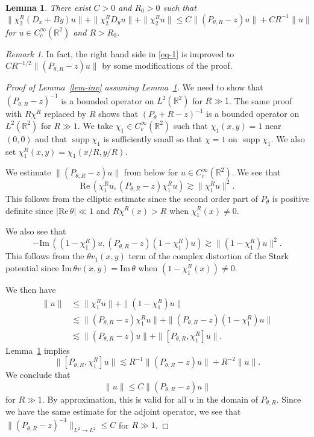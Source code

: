 \documentclass{article}
\theoremstyle{plain}
\newtheorem{lemma}[prop]{Lemma}
\theoremstyle{definition}
\theoremstyle{remark}
\newtheorem{remark}[prop]{Remark}
\newcommand{\RR}{\mathbb{R}}
\newcommand{\Cinf}{C^{\infty}}
\newcommand{\supp}{\mathop{\mathrm{supp}}}
\newcommand{\RE}{\mathrm{Re}\,}
\newcommand{\IM}{\mathrm{Im}\,}
\begin{document}
\begin{lemma}\label{lem-elliptic}
There exist $C>0$ and $R_0>0$ such that 
\begin{equation}\label{eq-1}
\|\chi_2^R (D_x+By)u\|+\|\chi_2^R D_y u\|+\|\chi_2^R u\|\le C\|(P_{\theta, R}-z)u\|+CR^{-1}\|u\|
\end{equation}
for $u\in \Cinf_c(\RR^2)$ and $R>R_0$. 
\end{lemma}

\begin{remark}
In fact, the right hand side in \eqref{eq-1} is improved to $CR^{-1/2}\|(P_{\theta, R}-z)u\|$ by some 
modifications of the proof. 
\end{remark}

\begin{proof}[Proof of Lemma~\ref{lem-inv} assuming Lemma~\ref{lem-elliptic}]
We need to show that $(P_{\theta, R}-z)^{-1}$ is a bounded operator on $L^2(\RR^2)$ for $R\gg 1$. 
The same proof with $R\chi^R$ replaced by $R$ shows that $(P_{\theta}+R-z)^{-1}$ is a bounded operator on $L^2(\RR^2)$ for $R\gg 1$. 
We take $\chi_1\in \Cinf_c(\RR^2)$ such that $\chi_1(x, y)=1$ near $(0, 0)$ and that 
$\supp \chi_1$ is sufficiently small so that $\chi=1$ on $\supp \chi_1$.  
We also set $\chi_1^R(x, y)=\chi_1(x/R, y/R)$. 

We estimate $\|(P_{\theta, R}-z)u\|$ from below for $u\in \Cinf_c(\RR^2)$.  
We see that 
\[
\RE(\chi_1^R u, (P_{\theta, R}-z)\chi_1^R u)\gtrsim\|\chi_1^R u\|^2. 
\]
This follows from the elliptic estimate since the second order part of $P_{\theta}$ is positive definite since $|\RE \theta|\ll 1$ 
and $R\chi^R(x)>R$ when $\chi_1^R(x)\not=0$. 

We also see that 
\[
-\IM((1-\chi_1^R) u, (P_{\theta, R}-z)(1-\chi_1^R) u)\gtrsim\|(1-\chi_1^R) u\|^2. 
\]
This follows from the $\theta v_1(x, y)$ term of the complex distortion of the Stark potential 
since $\IM\theta v(x, y)=\IM \theta$ when $(1-\chi_1^R(x))\not=0$. 

We then have
\begin{align*}
\|u\|&\le  \|\chi_1^R u\|+\|(1-\chi_1^R) u\|\\
     & \lesssim \|(P_{\theta, R}-z)\chi_1^R u\|+\|(P_{\theta, R}-z)(1-\chi_1^R) u\|\\ 
	 &\lesssim \|(P_{\theta, R}-z) u\|+\|[P_{\theta, R}, \chi_1^R] u\|. 
\end{align*}
Lemma~\ref{lem-elliptic} implies 
\[
\|[P_{\theta, R}, \chi_1^R] u\| \lesssim R^{-1}\|(P_{\theta, R}-z)u\|+R^{-2}\|u\|. 
\]
We conclude that 
\[
\|u\|\le C\|(P_{\theta, R}-z)u\|
\]
for $R\gg 1$. By approximation, this is valid for all $u$ in the domain of $P_{\theta, R}$. 
Since we have the same estimate for the adjoint operator, we see that 
$\|(P_{\theta, R}-z)^{-1}\|_{L^2\to L^2}\le C$ for $R\gg 1$.

\end{proof}
\end{document}
